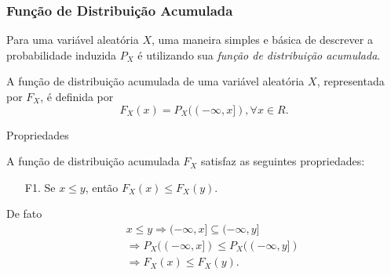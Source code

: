 \begin{frame}
\frametitle{\textbf{Função de Distribuição Acumulada}}
%
Para uma variável aleatória $X$, uma maneira simples e básica de
descrever a probabilidade induzida $P_X$ é utilizando sua {\em
função de distribuição acumulada}.
%
\begin{defi}
A função de distribuição acumulada de uma variável aleatória $X$,
representada por $F_X$, é definida por
%
$$F_X(x)=P_X((-\infty, x]), \forall x\in R.$$
\end{defi}

\begin{block}{Propriedades}

A função de distribuição acumulada $F_X$ satisfaz as seguintes
propriedades:
\begin{enumerate}
\item[F1.] Se $x\leq y$, então $F_X(x)\leq F_X(y)$.
\end{enumerate}
De fato
\begin{eqnarray}
& & x\leq y \Rightarrow (-\infty, x]\subseteq (-\infty, y] \nonumber \\
& & \Rightarrow P_X((-\infty, x])\leq P_X((-\infty, y])\nonumber \\
& & \Rightarrow F_X(x)\leq F_X(y).\nonumber
\end{eqnarray}

\end{block}
\end{frame}
%
%



